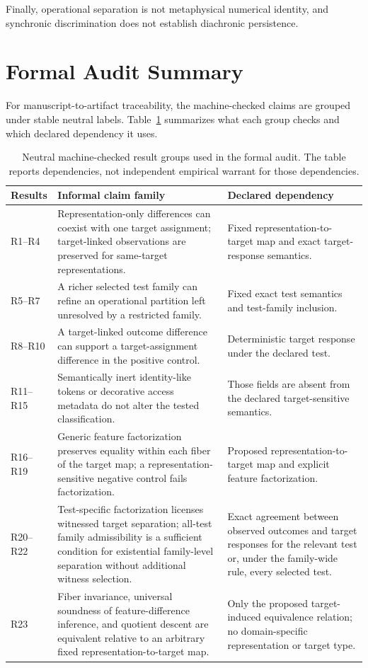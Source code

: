 \documentclass[11pt]{article}
\begin{document}
Finally, operational separation is not metaphysical numerical identity, and synchronic discrimination does not establish diachronic persistence.

\section{Formal Audit Summary}

For manuscript-to-artifact traceability, the machine-checked claims are grouped under stable neutral labels. Table~\ref{tab:formal-audit} summarizes what each group checks and which declared dependency it uses.

\begin{table}[ht]
\centering
\small
\begin{tabularx}{\textwidth}{@{}l X X@{}}
\toprule
\textbf{Results} & \textbf{Informal claim family} & \textbf{Declared dependency} \\
\midrule
R1--R4 & Representation-only differences can coexist with one target assignment; target-linked observations are preserved for same-target representations. & Fixed representation-to-target map and exact target-response semantics. \\
R5--R7 & A richer selected test family can refine an operational partition left unresolved by a restricted family. & Fixed exact test semantics and test-family inclusion. \\
R8--R10 & A target-linked outcome difference can support a target-assignment difference in the positive control. & Deterministic target response under the declared test. \\
R11--R15 & Semantically inert identity-like tokens or decorative access metadata do not alter the tested classification. & Those fields are absent from the declared target-sensitive semantics. \\
R16--R19 & Generic feature factorization preserves equality within each fiber of the target map; a representation-sensitive negative control fails factorization. & Proposed representation-to-target map and explicit feature factorization. \\
R20--R22 & Test-specific factorization licenses witnessed target separation; all-test family admissibility is a sufficient condition for existential family-level separation without additional witness selection. & Exact agreement between observed outcomes and target responses for the relevant test or, under the family-wide rule, every selected test. \\
R23 & Fiber invariance, universal soundness of feature-difference inference, and quotient descent are equivalent relative to an arbitrary fixed representation-to-target map. & Only the proposed target-induced equivalence relation; no domain-specific representation or target type. \\
\bottomrule
\end{tabularx}
\caption{Neutral machine-checked result groups used in the formal audit. The table reports dependencies, not independent empirical warrant for those dependencies.}
\label{tab:formal-audit}
\end{table}
\end{document}
